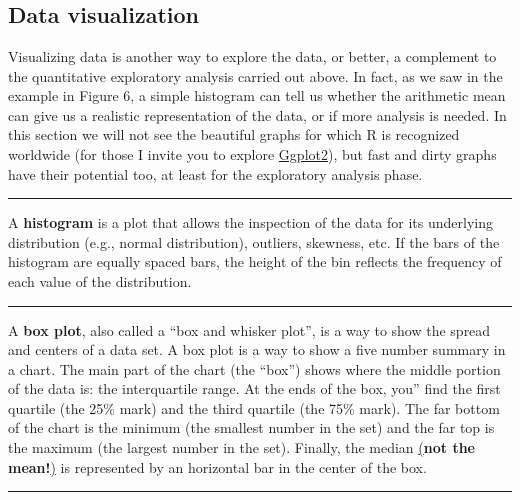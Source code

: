 \documentclass[
]{article}
\begin{document}
~

~

~

\hypertarget{data-visualization}{%
\subsection{Data visualization}\label{data-visualization}}

Visualizing data is another way to explore the data, or better, a
complement to the quantitative exploratory analysis carried out above.
In fact, as we saw in the example in Figure 6, a simple histogram can
tell us whether the arithmetic mean can give us a realistic
representation of the data, or if more analysis is needed. In this
section we will not see the beautiful graphs for which R is recognized
worldwide (for those I invite you to explore \protect\hyperlink{ggplot2}{Ggplot2}), but fast and
dirty graphs have their potential too, at least for the exploratory
analysis phase.

\begin{center}\rule{0.5\linewidth}{0.5pt}\end{center}

A \textbf{histogram} is a plot that allows the inspection of the data for its
underlying distribution (e.g., normal distribution), outliers, skewness,
etc. If the bars of the histogram are equally spaced bars, the height of
the bin reflects the frequency of each value of the distribution.

\begin{center}\rule{0.5\linewidth}{0.5pt}\end{center}

A \textbf{box plot}, also called a ``box and whisker plot'', is a way to show
the spread and centers of a data set. A box plot is a way to show a five
number summary in a chart. The main part of the chart (the ``box'') shows
where the middle portion of the data is: the interquartile range. At the
ends of the box, you'' find the first quartile (the 25\% mark) and the
third quartile (the 75\% mark). The far bottom of the chart is the
minimum (the smallest number in the set) and the far top is the maximum
(the largest number in the set). Finally, the median
\ul{(}\textbf{not the mean!}\ul{)} is represented by an
horizontal bar in the center of the box.

\begin{center}\rule{0.5\linewidth}{0.5pt}\end{center}
\end{document}
